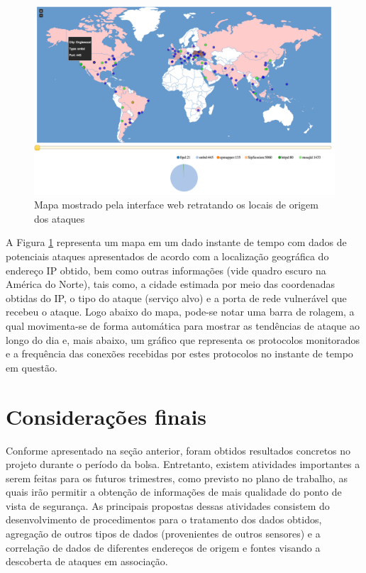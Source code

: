 \begin{figure}
\center
\includegraphics[width=1\textwidth]{figs/mapa.png}
\caption{Mapa mostrado pela interface web retratando os locais de origem dos ataques}
\label{mapa}
\end{figure}


A Figura \ref{mapa} representa um mapa em um dado instante de tempo com dados de potenciais ataques apresentados de acordo com a localização geográfica do endereço IP obtido, bem como outras informações (vide quadro escuro na América do Norte), tais como, a cidade estimada por meio das coordenadas obtidas do IP, o tipo do ataque (serviço alvo) e a porta de rede vulnerável que recebeu o ataque. Logo abaixo do mapa, pode-se notar uma barra de rolagem, a qual movimenta-se de forma automática para mostrar as tendências de ataque ao longo do dia e, mais abaixo, um gráfico que representa os protocolos monitorados e a frequência das conexões recebidas por estes protocolos no instante de tempo em questão.


\chapter{Considerações finais}
Conforme apresentado na seção anterior, foram obtidos resultados concretos no projeto durante o período da bolsa. Entretanto, existem atividades importantes a serem feitas para os futuros trimestres, como previsto no plano de trabalho, as quais irão permitir a obtenção de informações de mais qualidade do ponto de vista de segurança. As principais propostas dessas atividades consistem do desenvolvimento de procedimentos para o tratamento dos dados obtidos, agregação de outros tipos de dados (provenientes de outros sensores) e a correlação de dados de diferentes endereços de origem e fontes visando a descoberta de ataques em associação.

